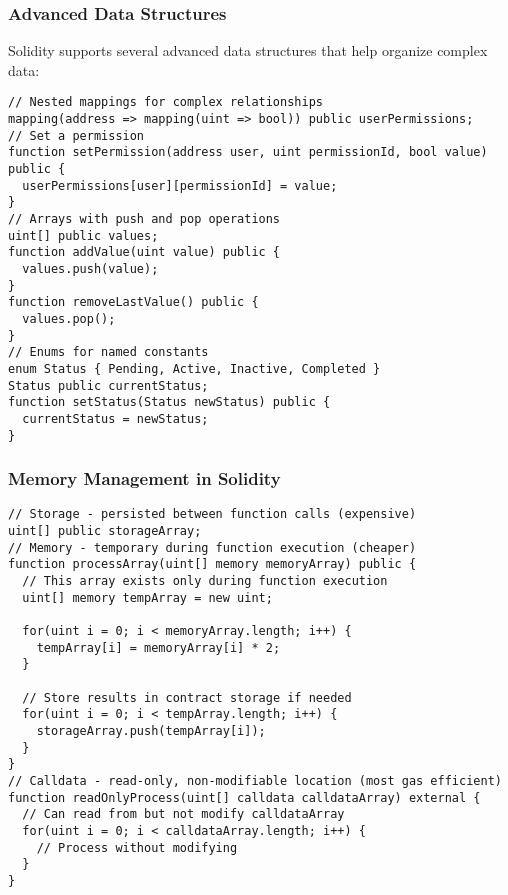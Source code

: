 \documentclass[12pt]{article}
\begin{document}
\noindent
\begin{minipage}[c]{\textwidth}
  \subsubsection*{Advanced Data Structures}

  Solidity supports several advanced data structures that help organize complex
  data:

  \begin{lstlisting}[language=Solidity]
// Nested mappings for complex relationships
mapping(address => mapping(uint => bool)) public userPermissions;
// Set a permission
function setPermission(address user, uint permissionId, bool value) public {
  userPermissions[user][permissionId] = value;
}
// Arrays with push and pop operations
uint[] public values;
function addValue(uint value) public {
  values.push(value);
}
function removeLastValue() public {
  values.pop();
}
// Enums for named constants
enum Status { Pending, Active, Inactive, Completed }
Status public currentStatus;
function setStatus(Status newStatus) public {
  currentStatus = newStatus;
}
\end{lstlisting}

  \subsubsection*{Memory Management in Solidity}

  \begin{lstlisting}[language=Solidity]
// Storage - persisted between function calls (expensive)
uint[] public storageArray;
// Memory - temporary during function execution (cheaper)
function processArray(uint[] memory memoryArray) public {
  // This array exists only during function execution
  uint[] memory tempArray = new uint;
  
  for(uint i = 0; i < memoryArray.length; i++) {
    tempArray[i] = memoryArray[i] * 2;
  }

  // Store results in contract storage if needed
  for(uint i = 0; i < tempArray.length; i++) {
    storageArray.push(tempArray[i]);
  }
}
// Calldata - read-only, non-modifiable location (most gas efficient)
function readOnlyProcess(uint[] calldata calldataArray) external {
  // Can read from but not modify calldataArray
  for(uint i = 0; i < calldataArray.length; i++) {
    // Process without modifying
  }
}
\end{lstlisting}
\end{minipage}
\end{document}

